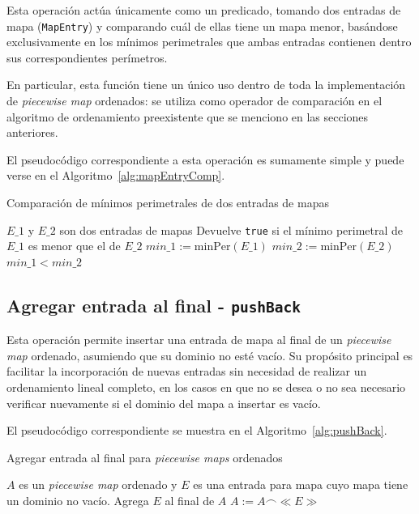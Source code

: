 Esta operación actúa únicamente como un predicado, tomando dos entradas de mapa (\texttt{MapEntry}) y comparando cuál de ellas tiene un mapa menor, basándose exclusivamente en los mínimos perimetrales que ambas entradas contienen dentro sus correspondientes perímetros.

En particular, esta función tiene un único uso dentro de toda la implementación de \textit{piecewise map} ordenados: se utiliza como operador de comparación en el algoritmo de ordenamiento preexistente que se menciono en las secciones anteriores.

El pseudocódigo correspondiente a esta operación es sumamente simple y puede verse en el Algoritmo~\ref{alg:mapEntryComp}.


\begin{algorithm}
\caption{Comparación de mínimos perimetrales de dos entradas de mapas}
\label{alg:mapEntryComp}
\begin{algorithmic}[1]
\Require $E\_1$ y $E\_2$ son dos entradas de mapas
\Ensure Devuelve \texttt{true} si el mínimo perimetral de $E\_1$ es menor que el de $E\_2$
    \State $min\_1 := \mathrm{minPer}(E\_1)$
    \State $min\_2 := \mathrm{minPer}(E\_2)$
    \State \Return $min\_1 < min\_2$
\EndFunction
\end{algorithmic}
\end{algorithm}

\subsection{Agregar entrada al final - \texttt{pushBack}}

Esta operación permite insertar una entrada de mapa al final de un \textit{piecewise map} ordenado, asumiendo que su dominio no esté vacío. Su propósito principal es facilitar la incorporación de nuevas entradas sin necesidad de realizar un ordenamiento lineal completo, en los casos en que no se desea o no sea necesario verificar nuevamente si el dominio del mapa a insertar es vacío.

El pseudocódigo correspondiente se muestra en el Algoritmo~\ref{alg:pushBack}.

\begin{algorithm}
\caption{Agregar entrada al final para \textit{piecewise maps} ordenados}
\label{alg:pushBack}
\begin{algorithmic}[1]
\Require $A$ es un \textit{piecewise map} ordenado y $E$ es una entrada para mapa cuyo mapa tiene un dominio no vacío.
\Ensure Agrega $E$ al final de $A$
    \State $A := A \frown \ll E \gg$
\EndFunction
\end{algorithmic}
\end{algorithm}


